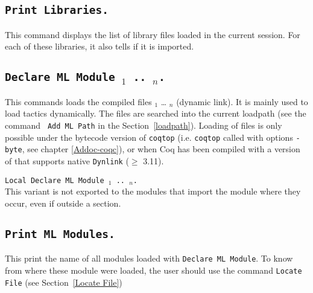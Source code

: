 \subsection[\tt Print Libraries.]{\tt Print Libraries.}

This command displays the list of library files loaded in the current
{\Coq} session. For each of these libraries, it also tells if it is
imported.

\subsection[\tt Declare ML Module {\str$_1$} .. {\str$_n$}.]{\tt Declare ML Module {\str$_1$} .. {\str$_n$}.}
This commands loads the {\ocaml} compiled files {\str$_1$} {\ldots}
{\str$_n$} (dynamic link). It is mainly used to load tactics
dynamically.
 The files are
searched into the current {\ocaml} loadpath (see the command {\tt
Add ML Path} in the Section~\ref{loadpath}).  Loading of {\ocaml}
files is only possible under the bytecode version of {\tt coqtop}
(i.e. {\tt coqtop} called with options {\tt -byte}, see chapter 
\ref{Addoc-coqc}), or when Coq has been compiled with a version of
{\ocaml} that supports native {\tt Dynlink} ($\ge$ 3.11).

\begin{Variants}
\item {\tt Local Declare ML Module {\str$_1$} .. {\str$_n$}.}\\
  This variant is not exported to the modules that import the module
  where they occur, even if outside a section.
\end{Variants}

\begin{ErrMsgs}
\item {}
\item {}
\end{ErrMsgs}

\subsection[\tt Print ML Modules.]{\tt Print ML Modules.}
This print the name of all \ocaml{} modules loaded with \texttt{Declare
  ML Module}. To know from where these module were loaded, the user
should use the command \texttt{Locate File} (see Section~\ref{Locate File})

